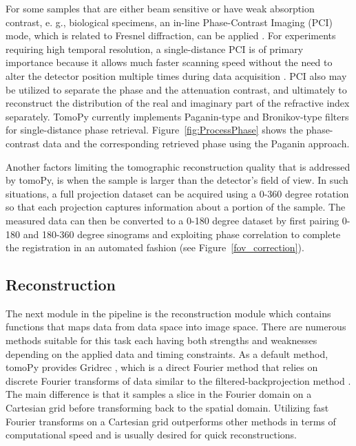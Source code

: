 \documentclass[pdf]{iucr}              %
\begin{document}
For some samples that are either beam sensitive or have weak absorption contrast, e. g., biological specimens, an in-line Phase-Contrast Imaging (PCI) mode, which is related to Fresnel diffraction, can be applied \cite{Davis1999}. For  experiments requiring high temporal resolution, a single-distance PCI is of primary importance because it allows much faster scanning speed without the need to alter the detector position multiple times during data acquisition \cite{Burvall:11}. PCI also may be utilized to separate the phase and the attenuation contrast, and ultimately to reconstruct the distribution of the real and imaginary part of the refractive index separately. TomoPy currently implements Paganin-type \cite{Paganin_2002} and Bronikov-type \cite{Bronnikov1999} filters for single-distance phase retrieval. Figure~\ref{fig:ProcessPhase} shows the phase-contrast data and the corresponding retrieved phase using the Paganin approach.

Another factors limiting the tomographic reconstruction quality that is addressed by tomoPy, is  when the sample is larger than the detector's field of view. In such situations, a full projection dataset can be acquired using a 0-360 degree rotation so that each projection captures information about a portion of the sample. The measured data can then be converted to a 0-180 degree dataset by first pairing 0-180 and 180-360 degree sinograms and exploiting phase correlation to complete the registration in an automated fashion (see Figure~\ref{fov_correction}). 

\subsection{Reconstruction}

The next module in the pipeline is the reconstruction module which contains functions that maps data from data space into image space. There are numerous methods suitable for this task each having both strengths and weaknesses depending on the applied data and timing constraints. As a default method, tomoPy provides Gridrec \cite{dowd}, which is a direct Fourier method that relies on discrete Fourier transforms of data similar to the filtered-backprojection method \cite{kak_slaney}. The main difference is that it samples a slice in the Fourier domain on a Cartesian grid before transforming back to the spatial domain. Utilizing fast Fourier transforms on a Cartesian grid outperforms other methods in terms of computational speed and is usually desired for quick reconstructions.
\end{document}
